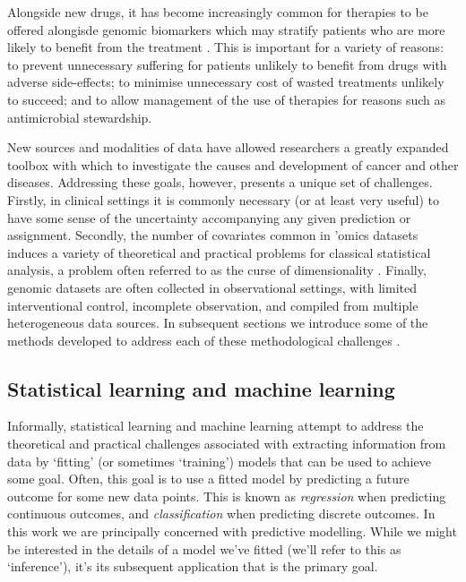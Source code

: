 \documentclass[thesis.tex]{subfiles}
\begin{document}
Alongside new drugs, it has become increasingly common for therapies to be offered alongisde genomic biomarkers which may stratify patients who are more likely to benefit from the treatment \citep{weber_egfr_2014, awad_precision_2019, zhu_association_2019, safarika_29-mrna_2021}. This is important for a variety of reasons: to prevent unnecessary suffering for patients unlikely to benefit from drugs with adverse side-effects; to minimise unnecessary cost of wasted treatments unlikely to succeed; and to allow management of the use of therapies for reasons such as antimicrobial stewardship.

New sources and modalities of data have allowed researchers a greatly expanded
toolbox with which to investigate the causes and development of cancer and other diseases. Addressing these goals, however, presents a unique set of challenges. Firstly, in clinical settings it is commonly necessary (or at least very useful) to have some sense of the uncertainty accompanying any given prediction or assignment. Secondly, the number of covariates common in ’omics datasets induces a variety of theoretical and practical problems for classical statistical analysis, a problem often referred to as the curse of dimensionality \citep{barbour_precision_2019, buhlmann_high-dimensional_2014}. Finally, genomic datasets are often collected in observational settings, with limited interventional control, incomplete observation, and compiled from multiple heterogeneous data sources. In subsequent sections we introduce some of the methods developed to address each of these methodological challenges .

\subsection{Statistical learning and machine learning} 
Informally, statistical learning and machine learning attempt to address the
theoretical and practical challenges associated with extracting information from data by `fitting' (or sometimes `training') models that can be used to achieve some goal.  Often, this goal is to use a fitted model by predicting a future outcome for some new data points. This is known as \emph{regression} when predicting continuous outcomes, and \emph{classification} when predicting discrete outcomes. In this work we are principally concerned with predictive modelling. While we might be interested in the details of a model we've fitted (we'll  refer to this as `inference'), it's its subsequent application that is the primary goal.
\end{document}
